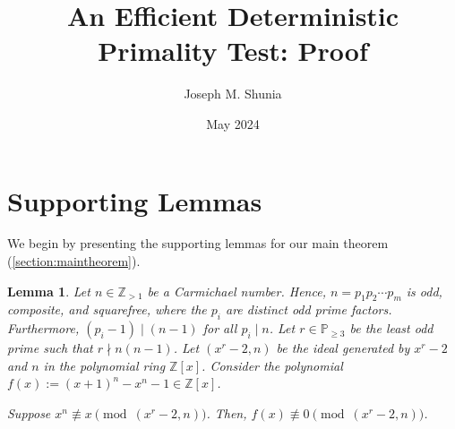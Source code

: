 \documentclass{article}
\title{An Efficient Deterministic Primality Test: Proof}
\author{Joseph M. Shunia}
\date{May 2024}
\theoremstyle{plain}
\newtheorem{lemma}[theorem]{Lemma}
\theoremstyle{definition}
\newcommand{\Z}{\mathbb{Z}}
\begin{document}
\maketitle

\section{Supporting Lemmas} \label{section:supportinglemmas}
We begin by presenting the supporting lemmas for our main theorem (\cref{section:maintheorem}).

\begin{lemma} \label{proof:carmichaelnumbersfail}
Let $n \in \Z_{>1}$ be a Carmichael number. Hence, $n = p_1 p_2 \cdots p_m$ is odd, composite, and squarefree, where the $p_i$ are distinct odd prime factors. Furthermore, $(p_i-1) \mid (n-1)$ for all $p_i \mid n$. Let $r \in \mathbb{P}_{\geq 3}$ be the least odd prime such that $r \nmid n (n-1)$. Let $(x^r-2, n)$ be the ideal generated by $x^r-2$ and $n$ in the polynomial ring $\Z[x]$. Consider the polynomial $f(x) := (x+1)^n - x^n - 1 \in \Z[x]$.

Suppose $x^n \not\equiv x \pmod{(x^r-2,n)}$. Then, $f(x) \not\equiv 0 \pmod{(x^r-2, n)}$.
\end{lemma}
\end{document}
